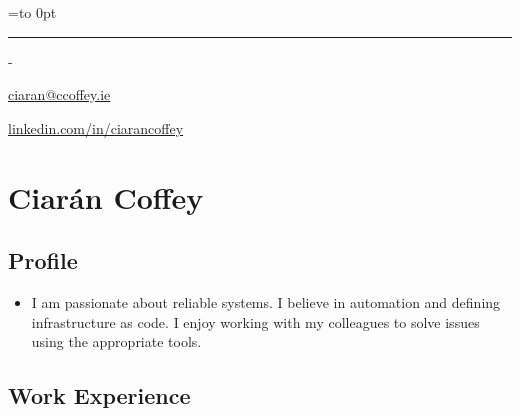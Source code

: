 \documentclass[]{article}
\date{}
\providecommand{\tightlist}{%
  \setlength{\itemsep}{0pt}\setlength{\parskip}{0pt}}
\newenvironment{nospace}
  {\par\edef\theprevdepth{\the\prevdepth}\nointerlineskip
   \setbox\zerobox=\vtop to 0pt\bgroup
   \hrule height0pt\kern\dimexpr\baselineskip-\topskip\relax
  }
  {\par\vss\egroup\ht\zerobox=0pt \wd\zerobox=0pt \dp\zerobox=0pt
   \box\zerobox}
\begin{document}
\begin{nospace}\begin{flushright}
\vspace{-2em}\href{mailto:ciaran@ccoffey.ie}{ciaran@ccoffey.ie}

\href{http://linkedin.com/in/ciarancoffey}{linkedin.com/in/ciarancoffey}
\end{flushright}\end{nospace}

\section{Ciarán Coffey}\label{ciaruxe1n-coffey}

\subsection{Profile}\label{profile}

\begin{itemize}
\tightlist
\item
  I am passionate about reliable systems. I believe in automation and
  defining infrastructure as code. I enjoy working with my colleagues to
  solve issues using the appropriate tools.
\end{itemize}

\subsection{Work Experience}\label{work-experience}
\end{document}
